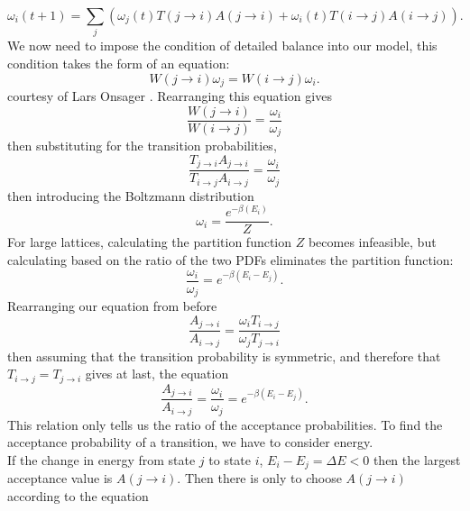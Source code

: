 \documentclass[10pt,a4paper]{article}
\begin{document}
\begin{equation}
\omega_i(t+1) = \sum_j \left( \omega_j(t)T(j\rightarrow i)A(j\rightarrow i) + \omega_i(t)T(i\rightarrow j)A(i\rightarrow j) \right).
\end{equation}
We now need to impose the condition of detailed balance into our model, this condition takes the form of an equation:
\begin{equation}
W(j \rightarrow i)\omega_j = W(i \rightarrow j)\omega_i. 
\end{equation}
courtesy of Lars Onsager \cite{onsager1931reciprocal}.
Rearranging this equation gives
\begin{equation*}
\frac{W(j \rightarrow i)}{W(i \rightarrow j)} = \frac{\omega_i }{\omega_j }
\end{equation*}
then substituting for the transition probabilities, 
\begin{equation*}
\frac{T_{j\rightarrow i}A_{j\rightarrow i}}{T_{i\rightarrow j}A_{i\rightarrow j}} = \frac{\omega_i }{\omega_j }
\end{equation*}
then introducing the Boltzmann distribution
\begin{equation}
\omega_i = \frac{e^{-\beta(E_i)}}{Z}.
\end{equation}
For large lattices, calculating the partition function $Z$ becomes infeasible, but calculating based on the ratio of the two PDFs eliminates the partition function:
\begin{equation*}
\frac{\omega_i }{\omega_j } = e^{-\beta(E_i-E_j)}.
\end{equation*}
Rearranging our equation from before
\begin{equation*}
\frac{A_{j\rightarrow i}}{A_{i\rightarrow j}} = \frac{\omega_i T_{i\rightarrow j}}{\omega_j T_{j\rightarrow i}}
\end{equation*}
then assuming that the transition probability is symmetric, and therefore that $T_{i\rightarrow j} = T_{j\rightarrow i}$ gives at last, the equation
\begin{equation}\label{Aji/Aij equation}
\frac{A_{j\rightarrow i}}{A_{i\rightarrow j}} =\frac{\omega_i }{\omega_j } = e^{-\beta(E_i-E_j)}.
\end{equation}
This relation only tells us the ratio of the acceptance probabilities. To find the acceptance probability of a transition, we have to consider energy.\\ If the change in energy from state $j$ to state $i$, $E_i-E_j=\Delta E<0$ then the largest acceptance value is $A(j\rightarrow i)$. Then there is only to choose $A(j \rightarrow i)$ according to the equation
\end{document}
